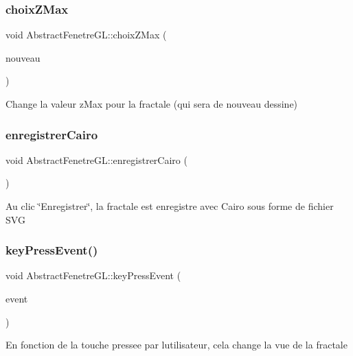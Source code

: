 \subsubsection{\texorpdfstring{choix\+Z\+Max}{choixZMax}}
{\footnotesize\ttfamily void Abstract\+Fenetre\+G\+L\+::choix\+Z\+Max (\begin{DoxyParamCaption}\item[{double}]{nouveau }\end{DoxyParamCaption})\hspace{0.3cm}{\ttfamily [slot]}}

Change la valeur z\+Max pour la fractale (qui sera de nouveau dessine) \mbox{\label{classAbstractFenetreGL_a797d71f2fa925e48139acb92a3f65ad6}} 
\subsubsection{\texorpdfstring{enregistrer\+Cairo}{enregistrerCairo}}
{\footnotesize\ttfamily void Abstract\+Fenetre\+G\+L\+::enregistrer\+Cairo (\begin{DoxyParamCaption}{ }\end{DoxyParamCaption})\hspace{0.3cm}{\ttfamily [slot]}}

Au clic \char`\"{}\+Enregistrer\char`\"{}, la fractale est enregistre avec Cairo sous forme de fichier S\+VG \mbox{\label{classAbstractFenetreGL_a22c2d178dafd49d27bc4a46f5b7fca3a}} 
\subsubsection{\texorpdfstring{key\+Press\+Event()}{keyPressEvent()}}
{\footnotesize\ttfamily void Abstract\+Fenetre\+G\+L\+::key\+Press\+Event (\begin{DoxyParamCaption}\item[{Q\+Key\+Event $\ast$}]{event }\end{DoxyParamCaption})}

En fonction de la touche pressee par l\textquotesingle{}utilisateur, cela change la vue de la fractale 

